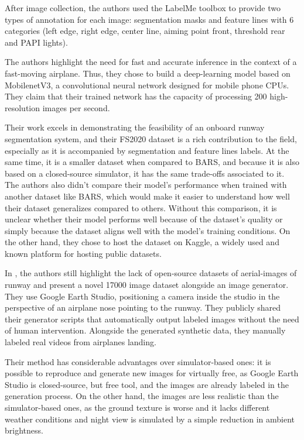 After image collection, the authors used the LabelMe toolbox to provide two types of annotation for each image: segmentation masks and feature lines with 6 categories (left edge, right edge, center line, aiming point front, threshold rear and PAPI lights).

The authors highlight the need for fast and accurate inference in the context of a fast-moving airplane. Thus, they chose to build a deep-learning model based on MobilenetV3, a convolutional neural network designed for mobile phone CPUs. They claim that their trained network has the capacity of processing 200 high-resolution images per second.

Their work excels in demonstrating the feasibility of an onboard runway segmentation system, and their FS2020 dataset is a rich contribution to the field, especially as it is accompanied by segmentation and feature lines labels. At the same time, it is a smaller dataset when compared to BARS, and because it is also based on a closed-source simulator, it has the same trade-offs associated to it. The authors also didn't compare their model's performance when trained with another dataset like BARS, which would make it easier to understand how well their dataset generalizes compared to others. Without this comparison, it is unclear whether their model performs well because of the dataset's quality or simply because the dataset aligns well with the model's training conditions. On the other hand, they chose to host the dataset on Kaggle, a widely used and known platform for hosting public datasets.

In \cite{ducoffe_lard_2023}, the authors still highlight the lack of open-source datasets of aerial-images of runway and present a novel 17000 image dataset alongside an image generator. They use Google Earth Studio, positioning a camera inside the studio in the perspective of an airplane nose pointing to the runway. They publicly shared their generator scripts that automatically output labeled images without the need of human intervention. Alongside the generated synthetic data, they manually labeled real videos from airplanes landing.

Their method has considerable advantages over simulator-based ones: it is possible to reproduce and generate new images for virtually free, as Google Earth Studio is closed-source, but free tool, and the images are already labeled in the generation process. On the other hand, the images are less realistic than the simulator-based ones, as the ground texture is worse and it lacks different weather conditions and night view is simulated by a simple reduction in ambient brightness.

